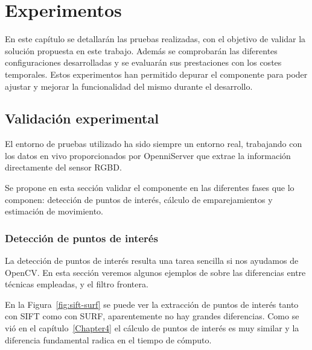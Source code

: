 
\chapter{Experimentos}

\label{Chapter5} %

En este capítulo se detallarán las pruebas realizadas, con el objetivo de validar la solución propuesta en este trabajo. Además se comprobarán las diferentes configuraciones desarrolladas y se evaluarán sus prestaciones con los costes temporales. Estos experimentos han permitido depurar el componente para poder ajustar y mejorar la funcionalidad del mismo durante el desarrollo.

\section{Validación experimental}

El entorno de pruebas utilizado ha sido siempre un entorno real, trabajando con los datos en vivo proporcionados por OpenniServer que extrae la información directamente del sensor RGBD.

Se propone en esta sección validar el componente en las diferentes fases que lo componen: detección de puntos de interés, cálculo de emparejamientos y estimación de movimiento.

\subsection{Detección de puntos de interés}

La detección de puntos de interés resulta una tarea sencilla si nos ayudamos de OpenCV. En esta sección veremos algunos ejemplos de sobre las diferencias entre técnicas empleadas, y el filtro frontera.

En la Figura~\ref{fig:sift-surf} se puede ver la extracción de puntos de interés tanto con SIFT como con SURF, aparentemente no hay grandes diferencias. Como se vió en el capítulo~\ref{Chapter4} el cálculo de puntos de interés es muy similar y la diferencia fundamental radica en el tiempo de cómputo.

